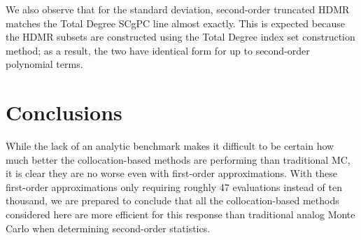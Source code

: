 We also observe that for the standard deviation, second-order truncated HDMR matches the Total Degree SCgPC
line almost exactly.  This is expected because the HDMR subsets are constructed using the Total Degree index
set construction method; as a result, the two have identical form for up to second-order polynomial
terms.

\section{Conclusions}
While the lack of an analytic benchmark makes it difficult to be certain how much better the collocation-based
methods are performing than traditional MC, it is clear they are no worse even with first-order
approximations.  With these first-order approximations only requiring roughly 47 evaluations
instead of ten thousand, we are prepared to conclude that all the collocation-based methods considered here
are more efficient for this response than traditional analog Monte Carlo when determining
second-order statistics.

%
%
